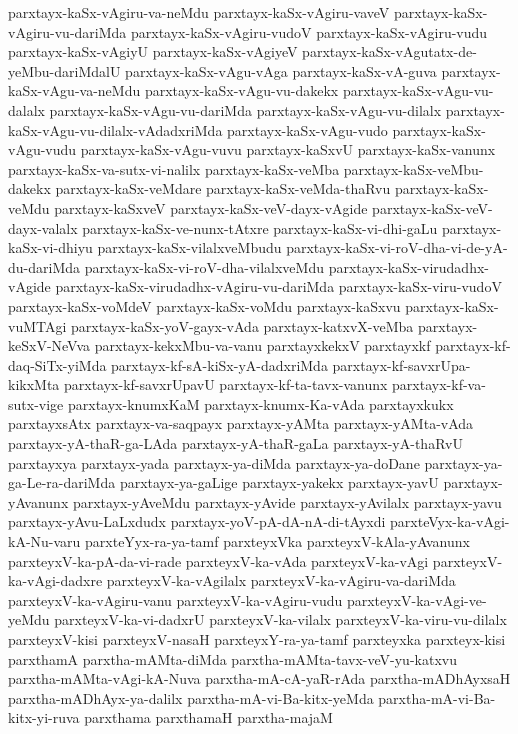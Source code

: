 {parxtayx-kaSx-vAgiru-va-neMdu
parxtayx-kaSx-vAgiru-vaveV
parxtayx-kaSx-vAgiru-vu-dariMda
parxtayx-kaSx-vAgiru-vudoV
parxtayx-kaSx-vAgiru-vudu
parxtayx-kaSx-vAgiyU
parxtayx-kaSx-vAgiyeV
parxtayx-kaSx-vAgutatx-de-yeMbu-dariMdalU
parxtayx-kaSx-vAgu-vAga
parxtayx-kaSx-vA-guva
parxtayx-kaSx-vAgu-va-neMdu
parxtayx-kaSx-vAgu-vu-dakekx
parxtayx-kaSx-vAgu-vu-dalalx
parxtayx-kaSx-vAgu-vu-dariMda
parxtayx-kaSx-vAgu-vu-dilalx
parxtayx-kaSx-vAgu-vu-dilalx-vAdadxriMda
parxtayx-kaSx-vAgu-vudo
parxtayx-kaSx-vAgu-vudu
parxtayx-kaSx-vAgu-vuvu
parxtayx-kaSxvU
parxtayx-kaSx-vanunx
parxtayx-kaSx-va-sutx-vi-nalilx
parxtayx-kaSx-veMba
parxtayx-kaSx-veMbu-dakekx
parxtayx-kaSx-veMdare
parxtayx-kaSx-veMda-thaRvu
parxtayx-kaSx-veMdu
parxtayx-kaSxveV
parxtayx-kaSx-veV-dayx-vAgide
parxtayx-kaSx-veV-dayx-valalx
parxtayx-kaSx-ve-nunx-tAtxre
parxtayx-kaSx-vi-dhi-gaLu
parxtayx-kaSx-vi-dhiyu
parxtayx-kaSx-vilalxveMbudu
parxtayx-kaSx-vi-roV-dha-vi-de-yA-du-dariMda
parxtayx-kaSx-vi-roV-dha-vilalxveMdu
parxtayx-kaSx-virudadhx-vAgide
parxtayx-kaSx-virudadhx-vAgiru-vu-dariMda
parxtayx-kaSx-viru-vudoV
parxtayx-kaSx-voMdeV
parxtayx-kaSx-voMdu
parxtayx-kaSxvu
parxtayx-kaSx-vuMTAgi
parxtayx-kaSx-yoV-gayx-vAda
parxtayx-katxvX-veMba
parxtayx-keSxV-NeVva
parxtayx-kekxMbu-va-vanu
parxtayxkekxV
parxtayxkf
parxtayx-kf-daq-SiTx-yiMda
parxtayx-kf-sA-kiSx-yA-dadxriMda
parxtayx-kf-savxrUpa-kikxMta
parxtayx-kf-savxrUpavU
parxtayx-kf-ta-tavx-vanunx
parxtayx-kf-va-sutx-vige
parxtayx-knumxKaM
parxtayx-knumx-Ka-vAda
parxtayxkukx
parxtayxsAtx
parxtayx-va-saqpayx
parxtayx-yAMta
parxtayx-yAMta-vAda
parxtayx-yA-thaR-ga-LAda
parxtayx-yA-thaR-gaLa
parxtayx-yA-thaRvU
parxtayxya
parxtayx-yada
parxtayx-ya-diMda
parxtayx-ya-doDane
parxtayx-ya-ga-Le-ra-dariMda
parxtayx-ya-gaLige
parxtayx-yakekx
parxtayx-yavU
parxtayx-yAvanunx
parxtayx-yAveMdu
parxtayx-yAvide
parxtayx-yAvilalx
parxtayx-yavu
parxtayx-yAvu-LaLxdudx
parxtayx-yoV-pA-dA-nA-di-tAyxdi
parxteVyx-ka-vAgi-kA-Nu-varu
parxteYyx-ra-ya-tamf
parxteyxVka
parxteyxV-kAla-yAvanunx
parxteyxV-ka-pA-da-vi-rade
parxteyxV-ka-vAda
parxteyxV-ka-vAgi
parxteyxV-ka-vAgi-dadxre
parxteyxV-ka-vAgilalx
parxteyxV-ka-vAgiru-va-dariMda
parxteyxV-ka-vAgiru-vanu
parxteyxV-ka-vAgiru-vudu
parxteyxV-ka-vAgi-ve-yeMdu
parxteyxV-ka-vi-dadxrU
parxteyxV-ka-vilalx
parxteyxV-ka-viru-vu-dilalx
parxteyxV-kisi
parxteyxV-nasaH
parxteyxY-ra-ya-tamf
parxteyxka
parxteyx-kisi
parxthamA
parxtha-mAMta-diMda
parxtha-mAMta-tavx-veV-yu-katxvu
parxtha-mAMta-vAgi-kA-Nuva
parxtha-mA-cA-yaR-rAda
parxtha-mADhAyxsaH
parxtha-mADhAyx-ya-dalilx
parxtha-mA-vi-Ba-kitx-yeMda
parxtha-mA-vi-Ba-kitx-yi-ruva
parxthama
parxthamaH
parxtha-majaM
}
